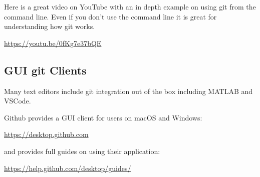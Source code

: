 Here is a great video on YouTube with an in depth example on using git from the command line. Even if you don't use the command line it is great for understanding how git works.
\begin{center}
	\url{https://youtu.be/0fKg7e37bQE}
\end{center}

\subsection{GUI git Clients}
Many text editors include git integration out of the box including MATLAB and VSCode. 

Github provides a GUI client for users on macOS and Windows:
\begin{center}
\url{https://desktop.github.com}
\end{center}

and provides full guides on using their application:
\begin{center}
	\url{https://help.github.com/desktop/guides/}
\end{center}




